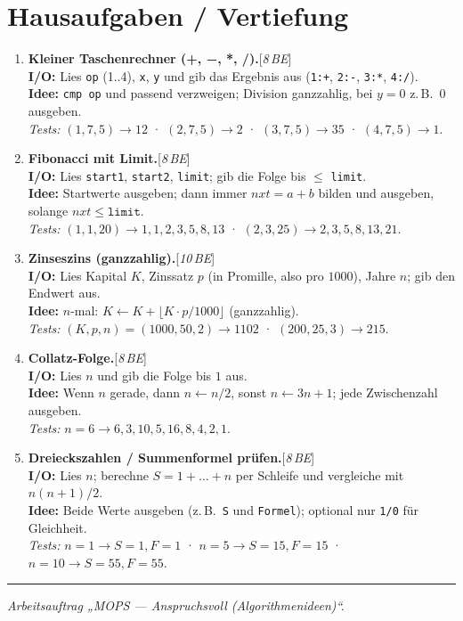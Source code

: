 \documentclass[11pt,a4paper]{scrartcl}
\newenvironment{aufgaben}{%
  \begin{enumerate}[leftmargin=*,label=\textbf{Aufgabe~\arabic*:}, itemsep=0.6em]
  }{\end{enumerate}}
\newcommand{\punkte}[1]{\hfill{\small[\textit{#1\,BE}]}}%
\begin{document}
  \section*{Hausaufgaben / Vertiefung}

  \begin{aufgaben}

    \item \textbf{Kleiner Taschenrechner (+, −, *, /).}\punkte{8}\\
    \textbf{I/O:} Lies \texttt{op} (1..4), \texttt{x}, \texttt{y} und gib das Ergebnis aus (\texttt{1:+}, \texttt{2:-}, \texttt{3:*}, \texttt{4:/}).\\
    \textbf{Idee:} \texttt{cmp op} und passend verzweigen; Division ganzzahlig, bei $y=0$ z.\,B.\ $0$ ausgeben.\\
    \emph{Tests:} $(1,7,5)\to 12$ \;·\; $(2,7,5)\to 2$ \;·\; $(3,7,5)\to 35$ \;·\; $(4,7,5)\to 1$.

    \item \textbf{Fibonacci mit Limit.}\punkte{8}\\
    \textbf{I/O:} Lies \texttt{start1}, \texttt{start2}, \texttt{limit}; gib die Folge bis $\le$ \texttt{limit}.\\
    \textbf{Idee:} Startwerte ausgeben; dann immer $nxt = a + b$ bilden und ausgeben, solange $nxt \le \texttt{limit}$.\\
    \emph{Tests:} $(1,1,20)\to 1,1,2,3,5,8,13$ \;·\; $(2,3,25)\to 2,3,5,8,13,21$.

    \item \textbf{Zinseszins (ganzzahlig).}\punkte{10}\\
    \textbf{I/O:} Lies Kapital $K$, Zinssatz $p$ (in Promille, also pro $1000$), Jahre $n$; gib den Endwert aus.\\
    \textbf{Idee:} $n$-mal: $K \gets K + \bigl\lfloor K\cdot p/1000 \bigr\rfloor$ (ganzzahlig).\\
    \emph{Tests:} $(K,p,n)=(1000,50,2)\to 1102$ \;·\; $(200,25,3)\to 215$.

    \item \textbf{Collatz-Folge.}\punkte{8}\\
    \textbf{I/O:} Lies $n$ und gib die Folge bis $1$ aus.\\
    \textbf{Idee:} Wenn $n$ gerade, dann $n \gets n/2$, sonst $n \gets 3n+1$; jede Zwischenzahl ausgeben.\\
    \emph{Tests:} $n=6\to 6,3,10,5,16,8,4,2,1$.

    \item \textbf{Dreieckszahlen / Summenformel prüfen.}\punkte{8}\\
    \textbf{I/O:} Lies $n$; berechne $S = 1+\dots+n$ per Schleife und vergleiche mit $n(n+1)/2$.\\
    \textbf{Idee:} Beide Werte ausgeben (z.\,B.\ \texttt{S} und \texttt{Formel}); optional nur \texttt{1/0} für Gleichheit.\\
    \emph{Tests:} $n=1\to S=1, F=1$ \;·\; $n=5\to S=15, F=15$ \;·\; $n=10\to S=55, F=55$.

  \end{aufgaben}

  \vfill
  \hrule
  \small\emph{Arbeitsauftrag „MOPS — Anspruchsvoll (Algorithmenideen)“.}
\end{document}
